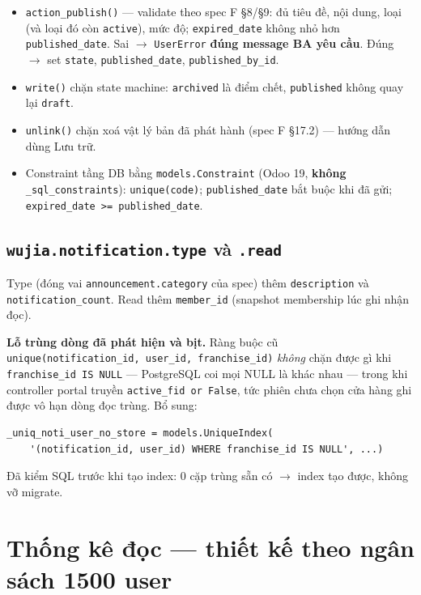 \begin{itemize}
  \item \texttt{action\_publish()} --- validate theo spec F §8/§9: đủ tiêu đề, nội dung, loại
    (và loại đó còn \texttt{active}), mức độ; \texttt{expired\_date} không nhỏ hơn
    \texttt{published\_date}. Sai $\to$ \texttt{UserError} \textbf{đúng message BA yêu cầu}.
    Đúng $\to$ set \texttt{state}, \texttt{published\_date}, \texttt{published\_by\_id}.
  \item \texttt{write()} chặn state machine: \texttt{archived} là điểm chết,
    \texttt{published} không quay lại \texttt{draft}.
  \item \texttt{unlink()} chặn xoá vật lý bản đã phát hành (spec F §17.2) --- hướng dẫn dùng
    Lưu trữ.
  \item Constraint tầng DB bằng \texttt{models.Constraint} (Odoo 19, \textbf{không}
    \texttt{\_sql\_constraints}): \texttt{unique(code)}; \texttt{published\_date} bắt buộc khi
    đã gửi; \texttt{expired\_date >= published\_date}.
\end{itemize}

\subsection{\texttt{wujia.notification.type} và \texttt{.read}}

Type (đóng vai \texttt{announcement.category} của spec) thêm \texttt{description} và
\texttt{notification\_count}. Read thêm \texttt{member\_id} (snapshot membership lúc ghi nhận đọc).

\textbf{Lỗ trùng dòng đã phát hiện và bịt.} Ràng buộc cũ
\texttt{unique(notification\_id, user\_id, franchise\_id)} \emph{không} chặn được gì khi
\texttt{franchise\_id IS NULL} --- PostgreSQL coi mọi NULL là khác nhau --- trong khi controller
portal truyền \texttt{active\_fid or False}, tức phiên chưa chọn cửa hàng ghi được vô hạn dòng đọc
trùng. Bổ sung:

\begin{verbatim}
_uniq_noti_user_no_store = models.UniqueIndex(
    '(notification_id, user_id) WHERE franchise_id IS NULL', ...)
\end{verbatim}

Đã kiểm SQL trước khi tạo index: 0 cặp trùng sẵn có $\to$ index tạo được, không vỡ migrate.

\section{Thống kê đọc --- thiết kế theo ngân sách 1500 user}

